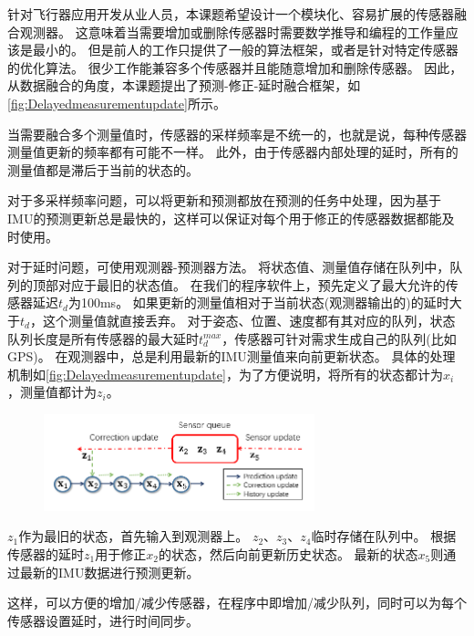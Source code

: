 \documentclass[
  type=master
]{gdutthesis}
\begin{document}
针对飞行器应用开发从业人员，本课题希望设计一个模块化、容易扩展的传感器融合观测器。
这意味着当需要增加或删除传感器时需要数学推导和编程的工作量应该是最小的。
但是前人的工作只提供了一般的算法框架，或者是针对特定传感器的优化算法。
很少工作能兼容多个传感器并且能随意增加和删除传感器。
因此，从数据融合的角度，本课题提出了预测-修正-延时融合框架，如\autoref{fig:Delayedmeasurementupdate}所示。

当需要融合多个测量值时，传感器的采样频率是不统一的，也就是说，每种传感器测量值更新的频率都有可能不一样。
此外，由于传感器内部处理的延时，所有的测量值都是滞后于当前的状态的。

对于多采样频率问题，可以将更新和预测都放在预测的任务中处理，因为基于IMU的预测更新总是最快的，这样可以保证对每个用于修正的传感器数据都能及时使用。

对于延时问题，可使用观测器-预测器方法\cite{khosravian2014velocity}。
将状态值、测量值存储在队列中，队列的顶部对应于最旧的状态值。
在我们的程序软件上，预先定义了最大允许的传感器延迟$t_d$为100ms。
如果更新的测量值相对于当前状态(观测器输出的)的延时大于$t_d$，这个测量值就直接丢弃。
对于姿态、位置、速度都有其对应的队列，状态队列长度是所有传感器的最大延时$t_d^{max}$，传感器可针对需求生成自己的队列(比如GPS)。
在观测器中，总是利用最新的IMU测量值来向前更新状态。
具体的处理机制如\autoref{fig:Delayedmeasurementupdate}，为了方便说明，将所有的状态都计为$x_i$，测量值都计为$z_i$。
\begin{figure}[htbp]
	\centering
	\includegraphics[width=0.7\textwidth]{Delayed and out-of-order measurement update.png}
	\label{fig:Delayedmeasurementupdate}
\end{figure} 

$z_1$作为最旧的状态，首先输入到观测器上。
$z_2$、$z_3$、$z_4$临时存储在队列中。
根据传感器的延时$z_1$用于修正$x_2$的状态，然后向前更新历史状态。
最新的状态$x_5$则通过最新的IMU数据进行预测更新。

这样，可以方便的增加/减少传感器，在程序中即增加/减少队列，同时可以为每个传感器设置延时，进行时间同步。
\end{document}
